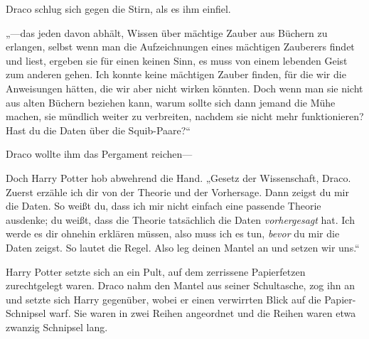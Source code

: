 Draco schlug sich gegen die Stirn, als es ihm einfiel.

„—das jeden davon abhält, Wissen über mächtige Zauber aus Büchern zu erlangen, selbst wenn man die Aufzeichnungen eines mächtigen Zauberers findet und liest, ergeben sie für einen keinen Sinn, es muss von einem lebenden Geist zum anderen gehen. Ich konnte keine mächtigen Zauber finden, für die wir die Anweisungen hätten, die wir aber nicht wirken könnten. Doch wenn man sie nicht aus alten Büchern beziehen kann, warum sollte sich dann jemand die Mühe machen, sie mündlich weiter zu verbreiten, nachdem sie nicht mehr funktionieren? Hast du die Daten über die Squib-Paare?“

Draco wollte ihm das Pergament reichen—

Doch Harry Potter hob abwehrend die Hand. „Gesetz der Wissenschaft, Draco. Zuerst erzähle ich dir von der Theorie und der Vorhersage. Dann zeigst du mir die Daten. So weißt du, dass ich mir nicht einfach eine passende Theorie ausdenke; du weißt, dass die Theorie tatsächlich die Daten \emph{vorhergesagt} hat. Ich werde es dir ohnehin erklären müssen, also muss ich es tun, \emph{bevor} du mir die Daten zeigst. So lautet die Regel. Also leg deinen Mantel an und setzen wir uns.“

Harry Potter setzte sich an ein Pult, auf dem zerrissene Papierfetzen zurechtgelegt waren. Draco nahm den Mantel aus seiner Schultasche, zog ihn an und setzte sich Harry gegenüber, wobei er einen verwirrten Blick auf die Papier-Schnipsel warf. Sie waren in zwei Reihen angeordnet und die Reihen waren etwa zwanzig Schnipsel lang.

